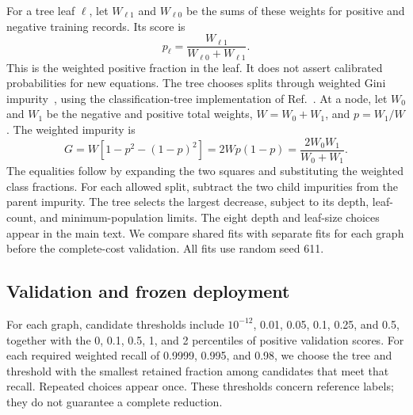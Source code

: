 For a tree leaf $\ell$, let $W_{\ell 1}$ and $W_{\ell 0}$ be the sums of these weights for positive and negative training records. Its score is
\begin{equation}
 p_\ell=\frac{W_{\ell 1}}{W_{\ell 0}+W_{\ell 1}}.
\label{eq:refinement-leaf}
\end{equation}
This is the weighted positive fraction in the leaf. It does not assert calibrated probabilities for new equations. The tree chooses splits through weighted Gini impurity~\cite{CART1984}, using the classification-tree implementation of Ref.~\cite{Pedregosa2011Bounds}. At a node, let $W_0$ and $W_1$ be the negative and positive total weights, $W=W_0+W_1$, and $p=W_1/W$. The weighted impurity is
\begin{equation}
 G=W[1-p^2-(1-p)^2]
   =2Wp(1-p)=\frac{2W_0W_1}{W_0+W_1}.
 \label{eq:refinement-gini}
\end{equation}
The equalities follow by expanding the two squares and substituting the weighted class fractions. For each allowed split, subtract the two child impurities from the parent impurity. The tree selects the largest decrease, subject to its depth, leaf-count, and minimum-population limits. The eight depth and leaf-size choices appear in the main text. We compare shared fits with separate fits for each graph before the complete-cost validation. All fits use random seed 611.

\subsection{Validation and frozen deployment}
For each graph, candidate thresholds include $10^{-12}$, 0.01, 0.05, 0.1, 0.25, and 0.5, together with the 0, 0.1, 0.5, 1, and 2 percentiles of positive validation scores. For each required weighted recall of 0.9999, 0.995, and 0.98, we choose the tree and threshold with the smallest retained fraction among candidates that meet that recall. Repeated choices appear once. These thresholds concern reference labels; they do not guarantee a complete reduction.

